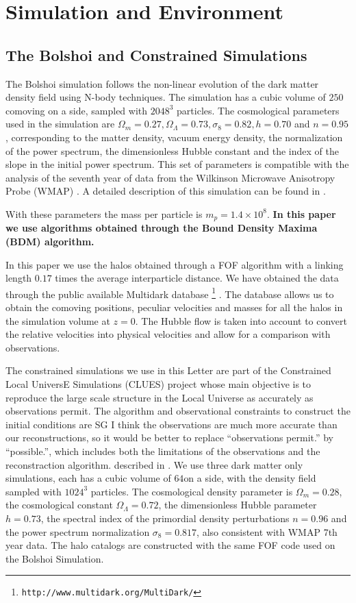 \documentclass{emulateapj}
\newcommand{\hMpc}{{\ifmmode{h^{-1}{\rm Mpc}}\else{$h^{-1}$Mpc }\fi}}
\newcommand{\hMsun}{{\ifmmode{h^{-1}{\rm {M_{\odot}}}}\else{$h^{-1}{\rm{M_{\odot}}}$}\fi}}
\begin{document}
\section{Simulation and Environment}
\label{sec:methods}
\subsection{The Bolshoi and Constrained Simulations}



The Bolshoi simulation follows the non-linear evolution of the dark matter density field using N-body techniques. The simulation has a cubic volume of $250$\hMpc comoving on a side, sampled with $2048^{3}$ particles. The cosmological parameters used in the simulation are $\Omega_{m}=0.27, \Omega_{\Lambda}=0.73, \sigma_{8}=0.82, h=0.70$ and $n=0.95$, corresponding to the matter density, vacuum energy density, the normalization of the power spectrum, the dimensionless Hubble constant and the index of the slope in the initial power spectrum. This set of parameters is compatible with the analysis  of the seventh year of data from the Wilkinson Microwave Anisotropy Probe (WMAP) \citep{Jarosik2011}. A detailed description of this simulation can be found in \citep{Bolshoi}.

With these parameters the mass per particle is $m_{p}=1.4\times 10^{8}$\hMsun. {\bf  In this paper we use algorithms obtained through the Bound Density Maxima (BDM) algorithm.}


In this paper we use the halos obtained through a FOF algorithm with a linking length $0.17$ times the average interparticle distance. We have obtained the data through the public available Multidark database \footnote{{\tt http://www.multidark.org/MultiDark/}} \citep{2011arXiv1109.0003R}. The database allows us to obtain the comoving positions, peculiar velocities and masses for all the halos in the simulation volume at $z=0$. The Hubble flow is taken into account to convert the relative velocities into physical velocities and allow for a comparison with observations.

The constrained simulations we use in this Letter are part of the Constrained Local UniversE Simulations (CLUES) project whose main objective is to reproduce the large scale structure in the Local Universe as accurately as observations permit. The algorithm and observational constraints to construct the initial conditions are
SG  I think the observations are much more accurate than our reconstructions, so it would be better to replace 
 ``observations permit.''  by ``possible.'', which includes both the limitations of the observations and the reconstraction algorithm.
 described in \citep{clues2010}.  We use three dark matter only simulations, each has a cubic volume of $64$\hMpc on a side, with the density field sampled with $1024^3$ particles. The cosmological density parameter is $\Omega_m=0.28$, the cosmological constant $\Omega_{\Lambda}=0.72$, the dimensionless Hubble parameter $h=0.73$, the spectral index of the primordial density perturbations $n=0.96$ and the power spectrum normalization $\sigma_{8}=0.817$, also consistent with WMAP 7th year data. The halo catalogs are constructed with the same FOF code used on the Bolshoi Simulation.
\end{document}
